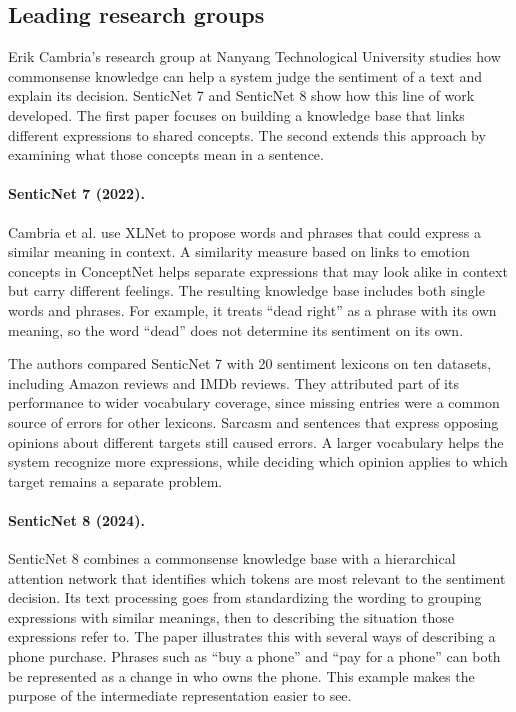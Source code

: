 \subsection{Leading research groups}\label{sec:groups}

Erik Cambria's research group at Nanyang Technological University
studies how commonsense knowledge can help a system judge the
sentiment of a text and explain its decision. SenticNet 7 and
SenticNet 8 show how this line of work developed. The first paper
focuses on building a knowledge base that links different expressions
to shared concepts. The second extends this approach by examining
what those concepts mean in a sentence.

\paragraph{SenticNet 7 (2022).}
Cambria et al.\citep{cambria2022senticnet} use XLNet to propose
words and phrases that could express a similar meaning in context.
A similarity measure based on links to emotion concepts in ConceptNet
helps separate expressions that may look alike in context but carry
different feelings. The resulting knowledge base includes both
single words and phrases. For example, it treats ``dead right'' as
a phrase with its own meaning, so the word ``dead'' does not determine
its sentiment on its own.

The authors compared SenticNet 7 with 20 sentiment lexicons on ten
datasets, including Amazon reviews and IMDb reviews. They attributed
part of its performance to wider vocabulary coverage, since missing
entries were a common source of errors for other lexicons. Sarcasm
and sentences that express opposing opinions about different targets
still caused errors. A larger vocabulary helps the system recognize
more expressions, while deciding which opinion applies to which
target remains a separate problem.

\paragraph{SenticNet 8 (2024).}
SenticNet 8 combines a commonsense knowledge base with a hierarchical
attention network that identifies which tokens are most relevant
to the sentiment decision\citep{cambria2024senticnet}. Its text
processing goes from standardizing the wording to grouping expressions
with similar meanings, then to describing the situation those
expressions refer to. The paper illustrates this with several ways
of describing a phone purchase. Phrases such as ``buy a phone'' and
``pay for a phone'' can both be represented as a change in who owns
the phone. This example makes the purpose of the intermediate
representation easier to see.

